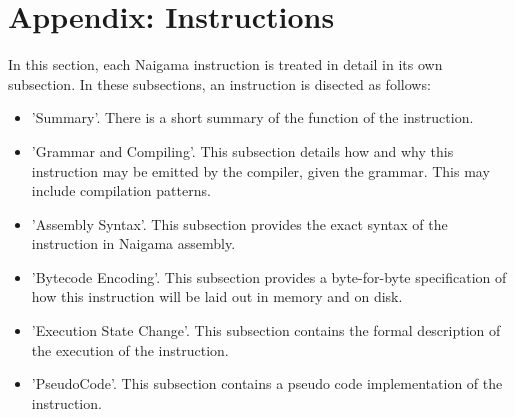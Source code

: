 \section{Appendix: Instructions}

In this section, each Naigama instruction is treated in detail in its own subsection.
In these subsections, an instruction is disected as follows:

\begin{itemize}
\item 'Summary'. There is a short summary of the function of the instruction.
\item 'Grammar and Compiling'. This subsection details how and why this
      instruction may be emitted by the compiler, given the grammar.
      This may include compilation patterns.
\item 'Assembly Syntax'. This subsection provides the exact syntax of
      the instruction in Naigama assembly.
\item 'Bytecode Encoding'. This subsection provides a byte-for-byte
      specification of how this instruction will be laid out in memory
      and on disk.
\item 'Execution State Change'. This subsection contains the formal
      description of the execution of the instruction.
\item 'PseudoCode'. This subsection contains a pseudo code implementation
      of the instruction.
\end{itemize}
